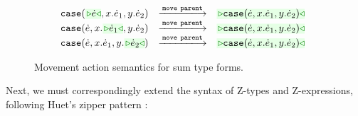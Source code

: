 \begin{figure}
\begin{displaymath}
\begin{array}{@{}rcl}
  \\
  \TABperformMove
      {      {\hcase{\zwsel{\hexp}}{x}{\hexp_1}{y}{\hexp_2}}}
      {\aMove{\dParent}}
      {\zwsel{\hcase{{\hexp}}{x}{\hexp_1}{y}{\hexp_2}}}
  \\
  \TABperformMove
      {      {\hcase{{\hexp}}{x}{\zwsel{\hexp_1}}{y}{\hexp_2}}}
      {\aMove{\dParent}}
      {\zwsel{\hcase{{\hexp}}{x}{\hexp_1}{y}{\hexp_2}}}
  \\
  \TABperformMove
      {      {\hcase{{\hexp}}{x}{\hexp_1}{y}{\zwsel{\hexp_2}}}}
      {\aMove{\dParent}}
      {\zwsel{\hcase{{\hexp}}{x}{\hexp_1}{y}{\hexp_2}}}
\end{array}
\end{displaymath}
\caption{Movement action semantics for sum type forms.}
\label{fig:sum-move}
\end{figure}

Next, we must correspondingly extend the syntax of Z-types and Z-expressions, following Huet's zipper pattern \cite{JFP::Huet1997}: 
%

